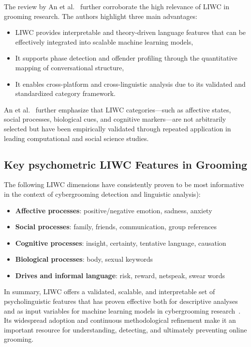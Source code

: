 The review by An et al.~\cite{an2025cybergrooming} further corroborate the high relevance of LIWC in grooming research. The authors highlight three main advantages:
\begin{itemize}
    \item LIWC provides interpretable and theory-driven language features that can be effectively integrated into scalable machine learning models,
    \item It supports phase detection and offender profiling through the quantitative mapping of conversational structure,
    \item It enables cross-platform and cross-linguistic analysis due to its validated and standardized category framework.
\end{itemize} %

An et al.~\cite{an2025cybergrooming} further emphasize that LIWC categories—such as affective states, social processes, biological cues, and cognitive markers—are not arbitrarily selected but have been empirically validated through repeated application in leading computational and social science studies. %


\subsection{Key psychometric LIWC Features in Grooming} \label{psychometric_liwc_features_in_grooming}
The following LIWC dimensions have consistently proven to be most informative in the context of cybergrooming detection and linguistic analysis\cite{gupta2012characterizingpedophileconversationsinternet,broome2020psycholinguistic,an2025cybergrooming}):
\begin{itemize}
    \item \textbf{Affective processes}: positive/negative emotion, sadness, anxiety
    \item \textbf{Social processes}: family, friends, communication, group references
    \item \textbf{Cognitive processes}: insight, certainty, tentative language, causation
    \item \textbf{Biological processes}: body, sexual keywords
    \item \textbf{Drives and informal language}: risk, reward, netspeak, swear words
\end{itemize} %

In summary, LIWC offers a validated, scalable, and interpretable set of psycholinguistic features that has proven  effective both for descriptive analyses and as input variables for machine learning models in cybergrooming research~\cite{an2025cybergrooming, gupta2012characterizingpedophileconversationsinternet, Cano2014, guo2023text,broome2020psycholinguistic}. Its widespread adoption and continuous methodological refinement make it an important resource for understanding, detecting, and ultimately preventing online grooming.

